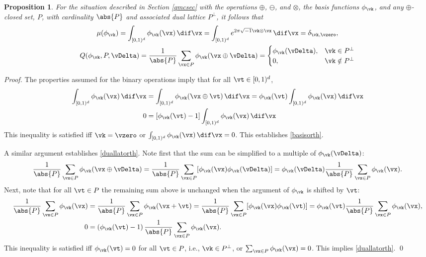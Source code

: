 \documentclass[graybox]{svmult}
\newcommand{\cube}{[0,1)^d}
\newtheorem{prop}[theorem]{Proposition}
\begin{document}
\begin{prop}\label{latnetprop} For the situation described in Section \ref{qmcsec} with the operations $\oplus$, $\ominus$, and $\otimes$, the basis functions $\phi_{\vk}$, and any $\oplus$-closed set, $P$, with cardinality $\abs{P}$ and associated dual lattice $P^{\perp}$, it follows that 
\begin{gather}
\label{basisorth}
\mu(\phi_{\vk})= \int_{\cube} \phi_{\vk}(\vx) \, \dif \vx = \int_{\cube} e^{2 \pi \sqrt{-1} \vk \otimes \vx} \, \dif \vx = \delta_{\vk, \vzero}, \\
\label{duallatorth}
Q(\phi_{\vk},P,\vDelta)= \frac{1}{\abs{P}}\sum_{\vx \in P} \phi_{\vk}(\vx \oplus \vDelta) = \begin{cases} \phi_{\vk}(\vDelta), & \vk \in P^{\perp} \\ 0, & \vk \notin P^{\perp}
\end{cases}
\end{gather}
\end{prop}
\begin{proof}
The properties assumed for the binary operations imply that for all $\vt \in \cube$,
\begin{align*}
\int_{\cube} \phi_{\vk}(\vx) \, \dif \vx &= \int_{\cube} \phi_{\vk}(\vx \oplus \vt) \, \dif \vx = \phi_{\vk}(\vt) \int_{\cube} \phi_{\vk}(\vx) \, \dif \vx\\
0 & = \left [\phi_{\vk}(\vt) -1 \right] \int_{\cube} \phi_{\vk}(\vx) \, \dif \vx
\end{align*}
This inequality is satisfied iff $\vk=\vzero$ or $\int_{\cube} \phi_{\vk}(\vx) \, \dif \vx =0$.  This establishes \eqref{basisorth}. 

A similar argument establishes \eqref{duallatorth}.  Note first that the sum can be simplified to a multiple of $\phi_{\vk}(\vDelta)$:
\begin{equation*}
\frac{1}{\abs{P}}\sum_{\vx \in P} \phi_{\vk}(\vx \oplus \vDelta) 
= \frac{1}{\abs{P}}\sum_{\vx \in P} [\phi_{\vk}(\vx) \phi_{\vk}(\vDelta)] = \phi_{\vk}(\vDelta) \frac{1}{\abs{P}}\sum_{\vx \in P} \phi_{\vk}(\vx).
\end{equation*}
Next, note that for all $\vt \in P$ the remaining sum above is unchanged when the argument of $\phi_{\vk}$ is shifted by $\vt$:
\begin{align*}
\frac{1}{\abs{P}}\sum_{\vx \in P} \phi_{\vk}(\vx) 
& = \frac{1}{\abs{P}}\sum_{\vx \in P} \phi_{\vk}(\vx+\vt) 
= \frac{1}{\abs{P}}\sum_{\vx \in P} [\phi_{\vk}(\vx) \phi_{\vk}(\vt)] 
= \phi_{\vk}(\vt) \frac{1}{\abs{P}}\sum_{\vx \in P} \phi_{\vk}(\vx),\\
0 & = \left (\phi_{\vk}(\vt) -1 \right) \frac{1}{\abs{P}}\sum_{\vx \in P} \phi_{\vk}(\vx).
\end{align*}
This inequality is satisfied iff $\phi_{\vk}(\vt)=0$ for all $\vt \in P$, i.e., $\vk \in P^{\perp}$, or $\sum_{\vx \in P} \phi_{\vk}(\vx) =0$.  This implies \eqref{duallatorth}. \qed
\end{proof}
\end{document}
